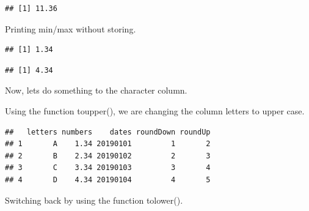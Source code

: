 \documentclass[]{book}
\newenvironment{Shaded}{\begin{snugshade}}{\end{snugshade}}
\newcommand{\CommentTok}[1]{\textcolor[rgb]{0.56,0.35,0.01}{\textit{#1}}}
\newcommand{\KeywordTok}[1]{\textcolor[rgb]{0.13,0.29,0.53}{\textbf{#1}}}
\newcommand{\NormalTok}[1]{#1}
\newcommand{\OperatorTok}[1]{\textcolor[rgb]{0.81,0.36,0.00}{\textbf{#1}}}
\newcommand{\StringTok}[1]{\textcolor[rgb]{0.31,0.60,0.02}{#1}}
\begin{document}
\begin{verbatim}
## [1] 11.36
\end{verbatim}

Printing min/max without storing.

\begin{Shaded}
\end{Shaded}

\begin{verbatim}
## [1] 1.34
\end{verbatim}

\begin{Shaded}
\end{Shaded}

\begin{verbatim}
## [1] 4.34
\end{verbatim}

Now, lets do something to the character column.

Using the function toupper(), we are changing the column letters to upper case.

\begin{Shaded}
\end{Shaded}

\begin{verbatim}
##   letters numbers    dates roundDown roundUp
## 1       A    1.34 20190101         1       2
## 2       B    2.34 20190102         2       3
## 3       C    3.34 20190103         3       4
## 4       D    4.34 20190104         4       5
\end{verbatim}

Switching back by using the function tolower().

\begin{Shaded}
\end{Shaded}
\end{document}
